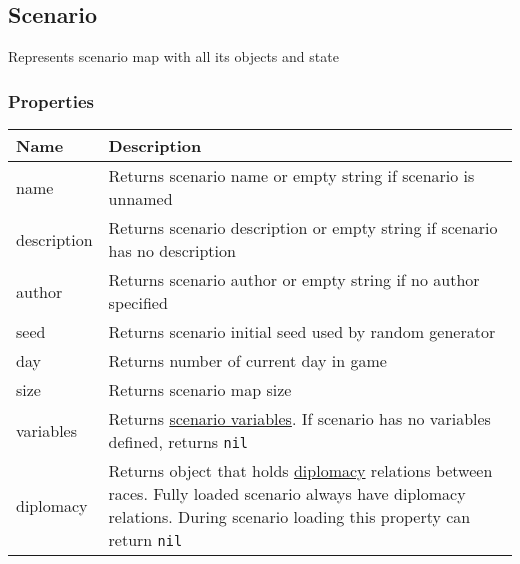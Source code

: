 \subsection{Scenario}
\label{Scenario}
Represents scenario map with all its objects and state
\subsubsection{Properties}
\begin{center}
\begin{tabularx}{\linewidth}{| l | X |}
\hline
\textbf{Name} & \textbf{Description} \\
\hline
name & Returns scenario name or empty string if scenario is unnamed\\
\hline
description & Returns scenario description or empty string if scenario has no description\\
\hline
author & Returns scenario author or empty string if no author specified\\
\hline
seed & Returns scenario initial seed used by random generator\\
\hline
day & Returns number of current day in game\\
\hline
size & Returns scenario map size\\
\hline
variables & Returns \hyperref[ScenarioVariables]{scenario variables}. If scenario has no variables defined, returns \texttt{nil}\\
\hline
diplomacy & Returns object that holds \hyperref[Diplomacy]{diplomacy} relations between races. Fully loaded scenario always have diplomacy relations. During scenario loading this property can return \texttt{nil}\\
\hline
\end{tabularx}
\end{center}

